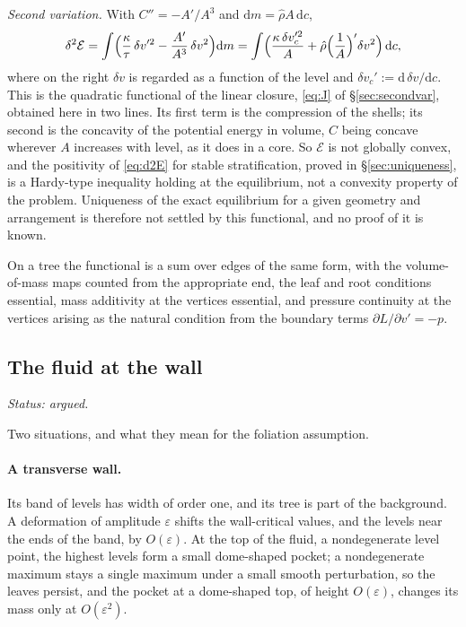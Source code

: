 \documentclass[11pt]{article}
\theoremstyle{definition}
\theoremstyle{remark}
\newcommand{\dc}{\,\mathrm{d}c}
\newcommand{\status}[1]{\noindent\emph{Status: #1}\par\smallskip}
\begin{document}
\emph{Second variation.} With $C'' = -A'/A^3$ and $\mathrm dm =
\hat\rho A\dc$,
\begin{equation}
  \delta^2\mathcal E
  = \int\Bigl(\frac{\kappa}{\tau}\,\delta v'^2 - \frac{A'}{A^3}\,\delta v^2\Bigr)\mathrm dm
  = \int\Bigl(\frac{\kappa\,\delta v_c'^2}{A}
    + \hat\rho\Bigl(\frac1A\Bigr)'\delta v^2\Bigr)\dc ,
  \label{eq:d2E}
\end{equation}
where on the right $\delta v$ is regarded as a function of the level
and $\delta v_c' := \mathrm d\,\delta v/\mathrm dc$. This is the
quadratic functional of the linear closure, \eqref{eq:J} of
\S\ref{sec:secondvar}, obtained here in two lines. Its first term is
the compression of the shells; its second is the concavity of the
potential energy in volume, $C$ being concave wherever $A$ increases
with level, as it does in a core. So $\mathcal E$ is not globally
convex, and the positivity of \eqref{eq:d2E} for stable
stratification, proved in \S\ref{sec:uniqueness}, is a Hardy-type
inequality holding at the equilibrium, not a convexity property of the
problem. Uniqueness of the exact equilibrium for a given geometry and
arrangement is therefore not settled by this functional, and no proof
of it is known.

On a tree the functional is a sum over edges of the same form, with
the volume-of-mass maps counted from the appropriate end, the leaf and
root conditions essential, mass additivity at the vertices essential,
and pressure continuity at the vertices arising as the natural
condition from the boundary terms $\partial L/\partial v' = -p$.

\subsection{The fluid at the wall}
\label{sec:fluidatwall}
\label{sec:NL-finite}

\status{argued.}

Two situations, and what they mean for the foliation assumption.

\paragraph{A transverse wall.} Its band of levels has width of order
one, and its tree is part of the background. A deformation of
amplitude $\varepsilon$ shifts the wall-critical values, and the levels
near the ends of the band, by $O(\varepsilon)$. At the top of the
fluid, a nondegenerate level point, the highest levels form a small
dome-shaped pocket; a nondegenerate maximum stays a single maximum
under a small smooth perturbation, so the leaves persist, and the
pocket at a dome-shaped top, of height $O(\varepsilon)$, changes its
mass only at $O(\varepsilon^2)$.
\end{document}
